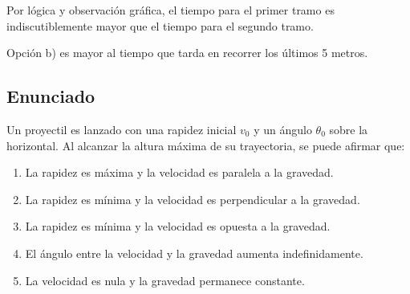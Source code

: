 \documentclass[12pt, a4paper]{article}
\begin{document}
Por lógica y observación gráfica, el tiempo para el primer tramo es indiscutiblemente mayor que el tiempo para el segundo tramo.

\begin{tcolorbox}[colback=green!5!white, colframe=green!50!black, title=Respuesta Final]
\centering Opción b) es mayor al tiempo que tarda en recorrer los últimos 5 metros.
\end{tcolorbox}

\newpage

\subsection*{Enunciado}
Un proyectil es lanzado con una rapidez inicial $v_0$ y un ángulo $\theta_0$ sobre la horizontal. Al alcanzar la altura máxima de su trayectoria, se puede afirmar que:
\begin{enumerate}[label=\alph*)]
    \item La rapidez es máxima y la velocidad es paralela a la gravedad.
    \item La rapidez es mínima y la velocidad es perpendicular a la gravedad.
    \item La rapidez es mínima y la velocidad es opuesta a la gravedad.
    \item El ángulo entre la velocidad y la gravedad aumenta indefinidamente.
    \item La velocidad es nula y la gravedad permanece constante.
\end{enumerate}

\begin{center}
\end{center}
\end{document}
